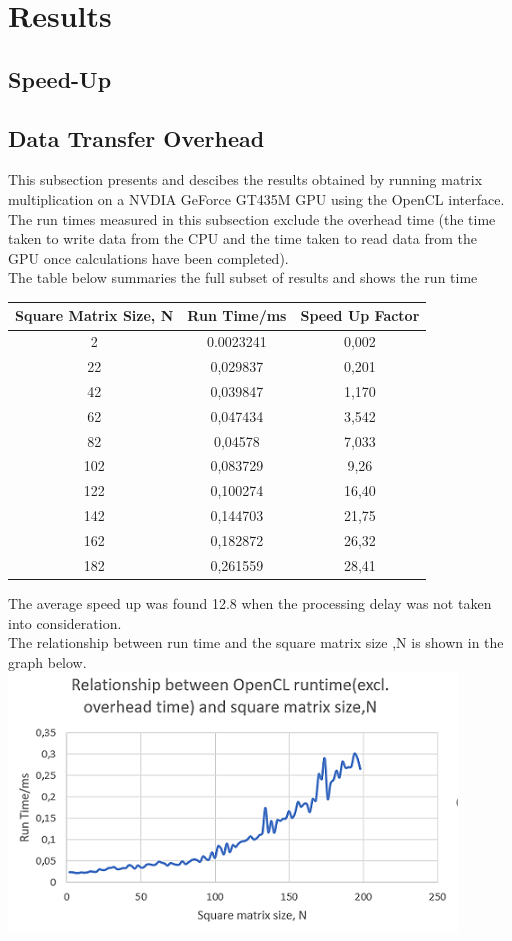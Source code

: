 \section{Results}


\subsection{Speed-Up}

\subsection{Data Transfer Overhead}
This subsection presents and descibes the results obtained by running matrix multiplication on a NVDIA GeForce GT435M GPU using the OpenCL interface. The run times measured in this subsection exclude the overhead time (the time taken to write data from the CPU and the time taken to read data from the GPU once calculations have been completed). 
\\
The table below summaries the full subset of results and shows the run time 
\begin{center}
	\begin{tabular}{||c c c||} 
		\hline
		Square Matrix Size, N &  Run Time/ms & Speed Up Factor \\ [0.1ex] 
		\hline\hline
		2 &	0.0023241 & 0,002\\
		\hline
		22 & 0,029837 & 0,201\\
		\hline
		42 & 0,039847 & 1,170\\
		\hline
		62 & 0,047434 & 3,542\\
		\hline
		82 & 0,04578 & 7,033\\
		\hline
		102	& 0,083729 & 9,26\\
		\hline
	    122	& 0,100274 & 16,40\\
		\hline
		142	& 0,144703 & 21,75\\
		\hline
		162	& 0,182872 & 26,32\\
		\hline
		182	& 0,261559 & 28,41\\
		\hline
		
	\end{tabular}
\end{center}
The average speed up was found 12.8 when the processing delay was not taken into consideration.
\\
The relationship between run time and the square matrix size ,N is shown in the graph below.
\\
\vspace{2mm}
\includegraphics{Figures/part2.PNG}

